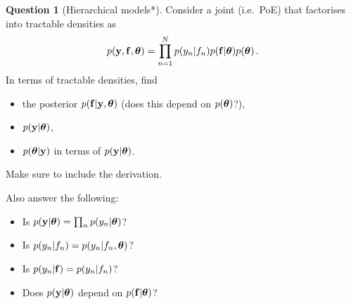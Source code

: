 \documentclass[a4paper]{article}
\theoremstyle{definition}
\newtheorem{question}{Question}
\begin{document}
\begin{question}[Hierarchical models*]
\label{q:poe-hierarchical-models}
Consider a joint (i.e.~PoE) that factorises into tractable densities as
\begin{align}
p(\mathbf{y}, \mathbf{f}, \boldsymbol{\theta}) = \prod_{n=1}^N p(y_n|f_n) p(\mathbf{f}|\boldsymbol{\theta}) p(\boldsymbol{\theta}) \,.
\end{align}
In terms of tractable densities, find
\begin{itemize}
\item the posterior $p(\mathbf{f}|\mathbf{y},\boldsymbol{\theta})$ (does this depend on $p(\boldsymbol{\theta})$?),
\item $p(\mathbf{y}|\boldsymbol{\theta})$,
\item $p(\boldsymbol{\theta}|\mathbf{y})$ in terms of $p(\mathbf{y}|\boldsymbol{\theta})$.
\end{itemize}
Make sure to include the derivation.

Also answer the following:
\begin{itemize}
\item Is $p(\mathbf{y}|\boldsymbol{\theta}) = \prod_{n} p(y_n|\boldsymbol{\theta})$?
\item Is $p(y_n|f_n) = p(y_n|f_n,\boldsymbol{\theta})$?
\item Is $p(y_n|\mathbf{f}) = p(y_n|f_n)$?
\item Does $p(\mathbf{y}|\boldsymbol{\theta})$ depend on $p(\mathbf{f}|\boldsymbol{\theta})$?
\end{itemize}
\end{question}
\end{document}
